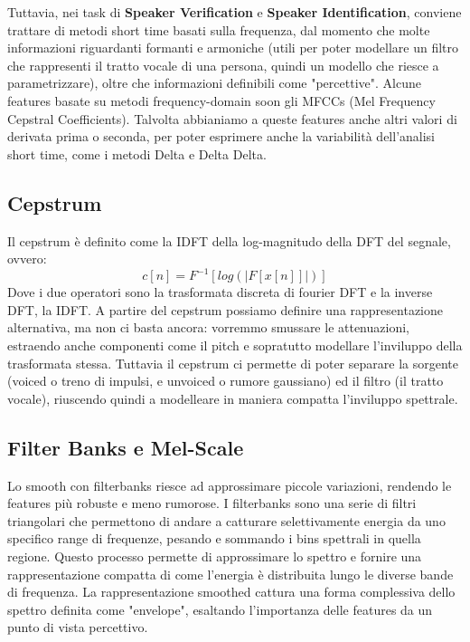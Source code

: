Tuttavia, nei task di \textbf{Speaker Verification} e \textbf{Speaker Identification}, conviene trattare di metodi short time basati sulla frequenza,
dal momento che molte informazioni riguardanti formanti e armoniche (utili per poter modellare un filtro che rappresenti il tratto vocale di una persona, quindi un modello
che riesce a parametrizzare), oltre che informazioni definibili come "percettive". Alcune features basate su metodi frequency-domain soon gli MFCCs (Mel Frequency Cepstral Coefficients).
Talvolta abbianiamo a queste features anche altri valori di derivata prima o seconda, per poter esprimere anche la variabilità dell'analisi short time, come i metodi Delta e Delta Delta.

\subsection{Cepstrum}
Il cepstrum è definito come la IDFT della log-magnitudo della DFT del segnale, ovvero:
\[ c[n] = F^{-1}[log(|F[x[n]]|) ]\]
Dove i due operatori sono la trasformata discreta di fourier DFT e la inverse DFT, la IDFT. A partire del cepstrum possiamo definire una rappresentazione alternativa,
ma non ci basta ancora: vorremmo smussare le attenuazioni, estraendo anche componenti come il pitch e sopratutto modellare l'inviluppo della trasformata stessa.
Tuttavia il cepstrum ci permette di poter separare la sorgente (voiced o treno di impulsi, e unvoiced o rumore gaussiano) ed il filtro (il tratto vocale), riuscendo quindi 
a modelleare in maniera compatta l'inviluppo spettrale. 

\subsection{Filter Banks e Mel-Scale}
Lo smooth con filterbanks riesce ad approssimare piccole variazioni, rendendo le features più robuste e meno rumorose. I filterbanks sono una serie di filtri
triangolari che permettono di andare a catturare selettivamente energia da uno specifico range di frequenze, pesando e sommando i bins spettrali in quella regione.
Questo processo permette di approssimare lo spettro e fornire una rappresentazione compatta di come l'energia è distribuita lungo le diverse bande di frequenza.
La rappresentazione smoothed cattura una forma complessiva dello spettro definita come "envelope", esaltando l'importanza delle features da un punto di vista percettivo.

